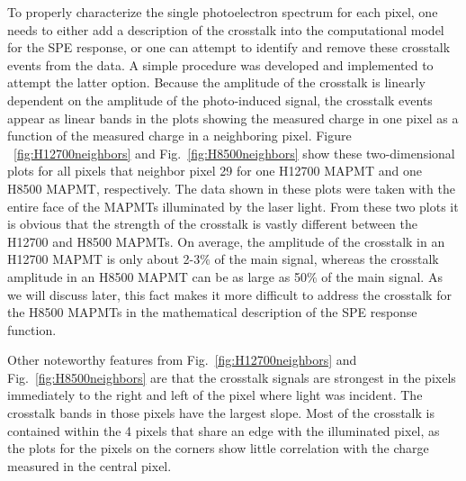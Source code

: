 To properly characterize the single photoelectron spectrum for each pixel, one needs to either add a description of the crosstalk into the computational model for the SPE response, or one can attempt to identify and remove these crosstalk events from the data. A simple procedure was developed and implemented to attempt the latter option. Because the amplitude of the crosstalk is linearly dependent on the amplitude of the photo-induced signal, the crosstalk events appear as linear bands in the plots showing the measured charge in one pixel as a function of the measured charge in a neighboring pixel. Figure ~\ref{fig:H12700neighbors} and Fig.~\ref{fig:H8500neighbors} show these two-dimensional plots for all pixels that neighbor pixel 29 for one H12700 MAPMT and one H8500 MAPMT, respectively. The data shown in these plots were taken with the entire face of the MAPMTs illuminated by the laser light. From these two plots it is obvious that the strength of the crosstalk is vastly different between the H12700 and H8500 MAPMTs. On average, the amplitude of the crosstalk in an H12700 MAPMT is only about 2-3$\%$ of the main signal, whereas the crosstalk amplitude in an H8500 MAPMT can be as large as 50$\%$ of the main signal. As we will discuss later, this fact makes it more difficult to address the crosstalk for the H8500 MAPMTs in the mathematical description of the SPE response function.

Other noteworthy features from Fig.~\ref{fig:H12700neighbors} and Fig.~\ref{fig:H8500neighbors} are that the crosstalk signals are strongest in the pixels immediately to the right and left of the pixel where light was incident. The crosstalk bands in those pixels have the largest slope. Most of the crosstalk is contained within the 4 pixels that share an edge with the illuminated pixel, as the plots for the pixels on the corners show little correlation with the charge measured in the central pixel.

